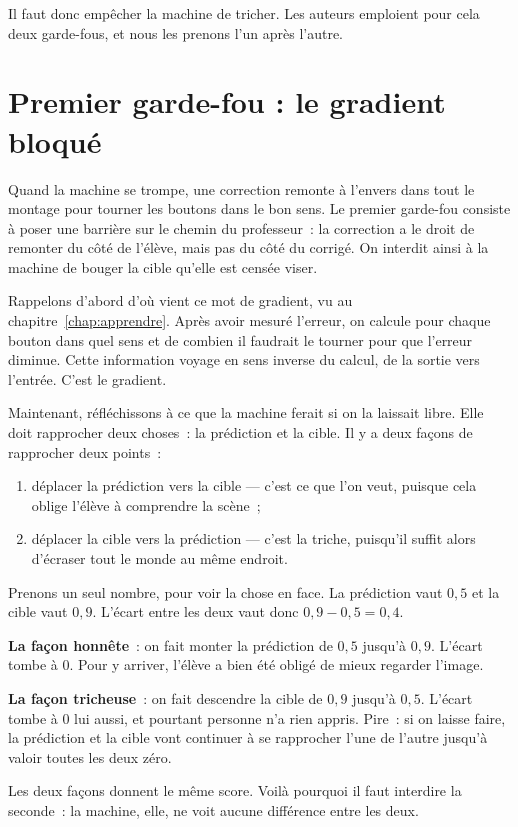 Il faut donc empêcher la machine de tricher. Les auteurs emploient pour
cela deux garde-fous, et nous les prenons l'un après l'autre.

\section{Premier garde-fou : le gradient bloqué}

\begin{enclair}
Quand la machine se trompe, une correction remonte à l'envers dans tout le
montage pour tourner les boutons dans le bon sens. Le premier garde-fou
consiste à poser une barrière sur le chemin du professeur~: la correction a
le droit de remonter du côté de l'élève, mais pas du côté du corrigé. On
interdit ainsi à la machine de bouger la cible qu'elle est censée viser.
\end{enclair}

Rappelons d'abord d'où vient ce mot de gradient, vu au
chapitre~\ref{chap:apprendre}. Après avoir mesuré l'erreur, on calcule pour
chaque bouton dans quel sens et de combien il faudrait le tourner pour que
l'erreur diminue. Cette information voyage en sens inverse du calcul, de la
sortie vers l'entrée. C'est le gradient.

Maintenant, réfléchissons à ce que la machine ferait si on la laissait
libre. Elle doit rapprocher deux choses~: la prédiction et la cible. Il y a
deux façons de rapprocher deux points~:

\begin{enumerate}
  \item déplacer la prédiction vers la cible — c'est ce que l'on veut,
        puisque cela oblige l'élève à comprendre la scène~;
  \item déplacer la cible vers la prédiction — c'est la triche, puisqu'il
        suffit alors d'écraser tout le monde au même endroit.
\end{enumerate}

\begin{exemple}
Prenons un seul nombre, pour voir la chose en face. La prédiction vaut
$0{,}5$ et la cible vaut $0{,}9$. L'écart entre les deux vaut donc
$0{,}9 - 0{,}5 = 0{,}4$.

\textbf{La façon honnête}~: on fait monter la prédiction de $0{,}5$ jusqu'à
$0{,}9$. L'écart tombe à $0$. Pour y arriver, l'élève a bien été obligé de
mieux regarder l'image.

\textbf{La façon tricheuse}~: on fait descendre la cible de $0{,}9$ jusqu'à
$0{,}5$. L'écart tombe à $0$ lui aussi, et pourtant personne n'a rien
appris. Pire~: si on laisse faire, la prédiction et la cible vont continuer
à se rapprocher l'une de l'autre jusqu'à valoir toutes les deux zéro.

Les deux façons donnent le même score. Voilà pourquoi il faut interdire la
seconde~: la machine, elle, ne voit aucune différence entre les deux.
\end{exemple}

